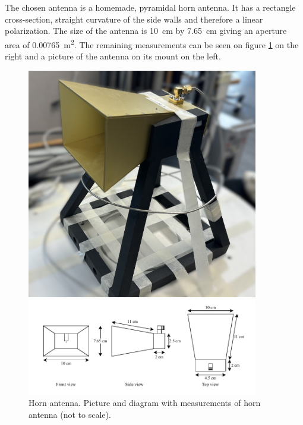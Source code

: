 The chosen antenna is a homemade, pyramidal horn antenna. It has a rectangle cross-section, straight curvature of the side walls and therefore a linear polarization. The size of the antenna is \SI{10}{\centi\meter} by \SI{7.65}{\centi\meter} giving an aperture area of \SI{0.00765}{\meter\squared}. The remaining measurements can be seen on figure \ref{fig:horn_design} on the right and a picture of the antenna on its mount on the left.

\begin{figure}[H]
    \begin{minipage}{0.35\textwidth}
        \centering
        \includegraphics[width=0.9\textwidth]{figures/IMG_2430.JPEG} %
    \end{minipage}\hfill
    \begin{minipage}{0.6\textwidth}
        \centering
        \includegraphics[width=0.9\textwidth]{figures/horn_diagram.pdf} %
    \end{minipage}
    \caption{Horn antenna. Picture and diagram with measurements of horn antenna (not to scale).}
    \label{fig:horn_design}
\end{figure}

